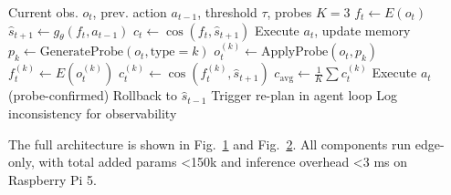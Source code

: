 \begin{algorithm}[!t]
\caption{ObserveGuard Runtime Protocol (Expanded)}
\label{alg:guard}
\begin{algorithmic}[1]
\Require Current obs. $o_t$, prev. action $a_{t-1}$, threshold $\tau$, probes $K=3$
\State $f_t \gets E(o_t)$ 
\State $\hat{s}_{t+1} \gets g_{\theta}(f_t, a_{t-1})$ 
\State $c_t \gets \cos(f_t, \hat{s}_{t+1})$
    \State \Return Execute $a_t$, update memory
\Else
        \State $p_k \gets \text{GenerateProbe}(o_t, \text{type}=k)$ 
        \State $o^{(k)}_t \gets \text{ApplyProbe}(o_t, p_k)$
        \State $f^{(k)}_t \gets E(o^{(k)}_t)$
        \State $c^{(k)}_t \gets \cos(f^{(k)}_t, \hat{s}_{t+1})$
    \EndFor
    \State $c_{\text{avg}} \gets \frac{1}{K} \sum c^{(k)}_t$
        \State \Return Execute $a_t$ (probe-confirmed)
    \Else
        \State Rollback to $\hat{s}_{t-1}$
        \State Trigger re-plan in agent loop
        \State Log inconsistency for observability
    \EndIf
\EndIf
\end{algorithmic}
\end{algorithm}

\begin{figure}[!t]
\centering
\label{fig:architecture}
\end{figure}

\begin{figure}[!t]
\centering
\label{fig:protocol-flow}
\end{figure}

The full architecture is shown in Fig.~\ref{fig:architecture} and Fig.~\ref{fig:protocol-flow}. All components run edge-only, with total added params <150k and inference overhead <3 ms on Raspberry Pi 5.

